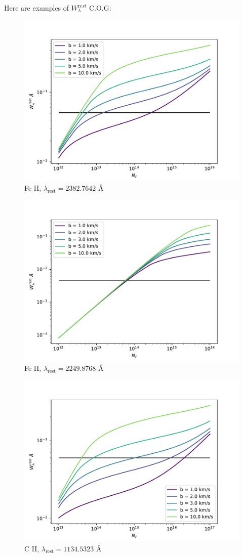 \documentclass[12pt,letterpaper]{article}
\newcommand{\mt}{\mathrm}
\newcommand{\EWrest}{W^{\mt rest}_\lambda}
\newcommand{\lambdarest}{\lambda_{\textrm{rest}}}
\begin{document}
Here are examples of $\EWrest$ C.O.G:
\begin{figure}[H]
    \centering
    \includegraphics[width=0.75\columnwidth]{images/Wl_N_Fe_II_1.pdf}
    \caption{Fe II, $\lambdarest = 2382.7642$ \AA}
\end{figure}
\begin{figure}[H]
    \centering
    \includegraphics[width=0.75\columnwidth]{images/Wl_N_Fe_II_2.pdf}
    \caption{Fe II, $\lambdarest = 2249.8768$ \AA}
\end{figure}
\begin{figure}[H]
    \centering
    \includegraphics[width=0.75\columnwidth]{images/Wl_N_C_II.pdf}
    \caption{C II, $\lambdarest = 1134.5323$ \AA}
\end{figure}
\end{document}
